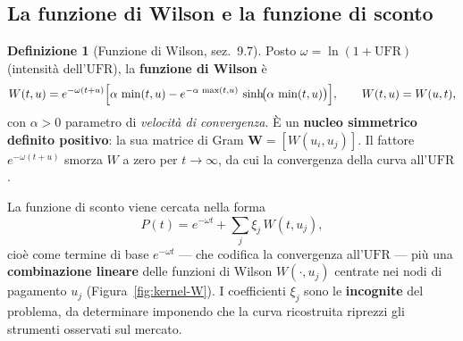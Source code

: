 \documentclass[11pt,a4paper]{article}
\theoremstyle{plain}
\theoremstyle{definition}
\newtheorem{definizione}[teorema]{Definizione}
\theoremstyle{remark}
\newcommand{\UFR}{\ensuremath{\mathrm{UFR}}}
\newcommand{\Qmat}{\mathbf{Q}}
\begin{document}
%
%

\subsection{La funzione di Wilson e la funzione di sconto}
\label{sub:kernel-W}

\begin{definizione}[Funzione di Wilson, \cite{eiopa2025} sez.~9.7]
Posto $\omega = \ln(1+\UFR)$ (intensit\`a dell'$\UFR$), la \textbf{funzione di Wilson} \`e
\[
  W(t,u) = e^{-\omega(t+u)}\Bigl[\alpha\,\min(t,u)
           - e^{-\alpha\,\max(t,u)}\,\sinh\!\bigl(\alpha\,\min(t,u)\bigr)\Bigr],
  \qquad W(t,u)=W(u,t),
\]
con $\alpha>0$ parametro di \emph{velocit\`a di convergenza}. \`E un \textbf{nucleo simmetrico
definito positivo}: la sua matrice di Gram $\mathbf{W}=[W(u_i,u_j)]$. Il fattore $e^{-\omega(t+u)}$ smorza $W$ a zero per
$t\to\infty$, da cui la convergenza della curva all'$\UFR$.
\end{definizione}

La funzione di sconto viene cercata nella forma
\begin{equation}
  P(t) = e^{-\omega t} + \textstyle\sum_{j} \xi_j\, W(t,u_j),
  \label{eq:sw-P-W}
\end{equation}
cio\`e come termine di base $e^{-\omega t}$ --- che codifica la convergenza all'$\UFR$ --- pi\`u
una \textbf{combinazione lineare} delle funzioni di Wilson $W(\cdot,u_j)$ centrate nei nodi di
pagamento $u_j$ (Figura~\ref{fig:kernel-W}). I coefficienti $\xi_j$ sono le \textbf{incognite}
del problema, da determinare imponendo che la curva ricostruita riprezzi gli strumenti
osservati sul mercato.
\end{document}
